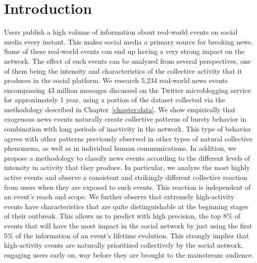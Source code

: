 \section{Introduction}

Users publish a high volume of information about real-world events on social
media every instant.
%
This makes social media a primary source for breaking news.
%
Some of these real-world events can end up having a very strong impact on the
network.  
%
The effect of such events can be analyzed from several perspectives, one of them
being the intensity and characteristics of the collective activity that it
produces in the social platform. 
%
We research 5,234 real-world news events encompassing 43 million messages
discussed on the Twitter microblogging service for approximately 1 year, using a
portion of the dataset collected via the methodology described in
Chapter~\ref{chapter:data}.
%
We show empirically that exogenous news events naturally create collective
patterns of bursty behavior in combination with long periods of inactivity in
the network. 
%
This type of behavior agrees with other patterns previously observed in other
types of natural collective phenomena, as well as in individual human
communications. 
%
In addition, we propose a methodology to classify news events according to the
different levels of intensity in activity that they produce. 
%
In particular, we analyze the most highly active events and observe a consistent
and strikingly different collective reaction from users when they are exposed to
such events. 
%
This reaction is independent of an event's reach and scope.  
%
We further observe that extremely high-activity events have characteristics that
are quite distinguishable at the beginning stages of their outbreak.  
%
This allows us to predict with high precision, the top 8\% of events that will
have the most impact in the social network by just using the first 5\% of the
information of an event's lifetime evolution. 
%
This strongly implies that high-activity events are naturally prioritized
collectively by the social network, engaging users early on, way before they are
brought to the mainstream audience.



